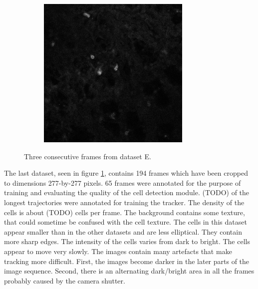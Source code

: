 \begin{figure}[h]
\begin{subfigure}{.32\textwidth}
		\end{subfigure}
		\hfill
		\begin{subfigure}{.32\textwidth}
		\includegraphics[width=\textwidth]{images/seriesm170_13cropped018}
		\end{subfigure}
		\caption{Three consecutive frames from dataset E.}
		\label{fig:data_datasetE}
	\end{figure}
        
    The last dataset, seen in figure \cref{fig:data_datasetE}, contains 194 frames which have been cropped to dimensions 277-by-277 pixels. 65 frames were annotated for the purpose of training and evaluating the quality of the cell detection module. (TODO) of the longest trajectories were annotated for training the tracker.    
    The density of the cells is about (TODO) cells per frame. The background contains some texture, that could sometime be confused with the cell texture. The cells in this dataset appear smaller than in the other datasets and are less elliptical. They contain more sharp edges. The intensity of the cells varies from dark to bright. The cells appear to move very slowly. The images contain many artefacts that make tracking more difficult. First, the images become darker in the later parts of the image sequence. Second, there is an alternating dark/bright area in all the frames probably caused by the camera shutter.
    	
